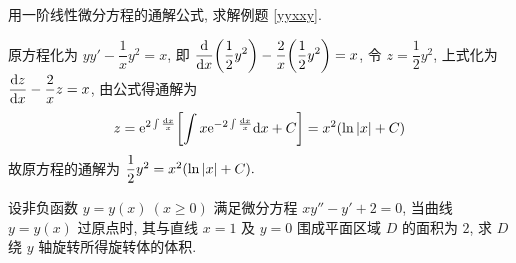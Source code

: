 \begin{example}
    用一阶线性微分方程的通解公式, 求解例题 \ref{yyxxy}.
\end{example}
\begin{solution}
    原方程化为 $yy'-\dfrac{1}{x}y^2=x$, 即 $\displaystyle\dv{x}\qty(\dfrac{1}{2}y^2)-\dfrac{2}{x}\qty(\dfrac{1}{2}y^2)=x$, 令 $z=\dfrac{1}{2}y^2$, 上式化为
    $\displaystyle\dv{z}{x}-\dfrac{2}{x}z=x$, 由公式得通解为
    $$z=\mathrm{e}^{2\int\frac{\dd x}{x}}\qty[\int x\mathrm{e}^{-2\int\frac{\dd x}{x}}\dd x+C]=x^2\qty(\ln|x|+C)$$
    故原方程的通解为 $\dfrac{1}{2}y^2=x^2\qty(\ln|x|+C).$
\end{solution}

\begin{example}[2009 数二]
    设非负函数 $y=y(x)~(x\geqslant 0)$ 满足微分方程 $xy''-y'+2=0$, 当曲线 $y=y(x)$ 过原点时, 其与直线 $x=1$ 及 $y=0$ 围成平面区域 $D$ 的面积为 $2$, 求 $D$ 绕 $y$ 轴旋转所得旋转体的体积.
\end{example}
